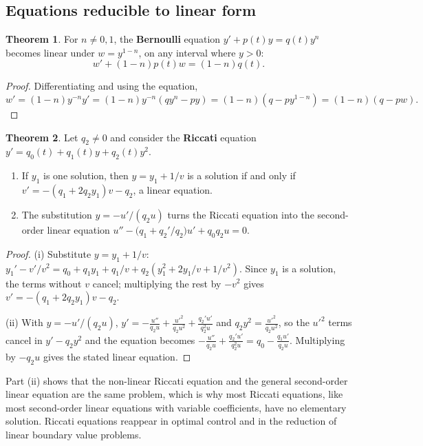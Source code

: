 \documentclass[11pt,a4paper]{article}
\numberwithin{equation}{section}
\theoremstyle{definition}
\newtheorem{thm}{Theorem}[subsection]
\begin{document}
\subsection{Equations reducible to linear form}
\label{ssec:reducible}

\begin{thm}
\label{thm:bernoulli}
For $n \neq 0, 1$, the \textbf{Bernoulli} equation $y' + p(t)y = q(t)y^n$ becomes linear under $w = y^{1-n}$, on any interval where $y > 0$:
\[
w' + (1 - n)p(t)w = (1 - n)q(t) .
\]
\end{thm}

\begin{proof}
Differentiating and using the equation,
\[
w' = (1 - n)y^{-n}y' = (1 - n)y^{-n}(qy^n - py) = (1 - n)(q - py^{1-n}) = (1 - n)(q - pw) .
\]
\end{proof}

\begin{thm}
\label{thm:riccati}
Let $q_2 \neq 0$ and consider the \textbf{Riccati} equation $y' = q_0(t) + q_1(t)y + q_2(t)y^2$.
\begin{enumerate}[label=(\roman*)]
\item If $y_1$ is one solution, then $y = y_1 + 1/v$ is a solution if and only if $v' = -(q_1 + 2q_2y_1)v - q_2$, a linear equation.
\item The substitution $y = -u'/(q_2u)$ turns the Riccati equation into the second-order linear equation $u'' - \bigl(q_1 + q_2'/q_2\bigr)u' + q_0q_2u = 0$.
\end{enumerate}
\end{thm}

\begin{proof}
(i) Substitute $y = y_1 + 1/v$: $y_1' - v'/v^2 = q_0 + q_1y_1 + q_1/v + q_2(y_1^2 + 2y_1/v + 1/v^2)$. Since $y_1$ is a solution, the terms without $v$ cancel; multiplying the rest by
$-v^2$ gives $v' = -(q_1 + 2q_2y_1)v - q_2$.

(ii) With $y = -u'/(q_2u)$, $y' = -\frac{u''}{q_2u} + \frac{u'^2}{q_2u^2} + \frac{q_2'u'}{q_2^2u}$ and $q_2y^2 = \frac{u'^2}{q_2u^2}$, so the $u'^2$ terms cancel in $y' - q_2y^2$ and the equation becomes
$-\frac{u''}{q_2u} + \frac{q_2'u'}{q_2^2u} = q_0 - \frac{q_1u'}{q_2u}$. Multiplying by $-q_2u$ gives the stated linear equation.
\end{proof}

Part (ii) shows that the non-linear Riccati equation and the general second-order linear equation are the same problem, which is why most Riccati
equations, like most second-order linear equations with variable coefficients, have no elementary solution. Riccati equations reappear in optimal
control and in the reduction of linear boundary value problems.
\end{document}
